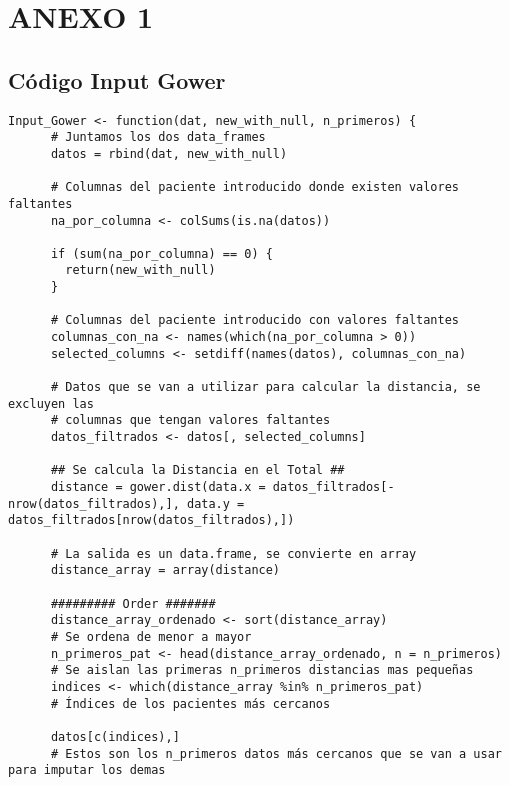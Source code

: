 \section{ANEXO 1}\label{sec:anexo1}


\subsection{Código Input Gower}\label{sec:codigo-input-gower}

\vspace{-5pt}

\begin{multicols}{2} %
  \begin{lstlisting}[style=mystyle]
    Input_Gower <- function(dat, new_with_null, n_primeros) {
      # Juntamos los dos data_frames
      datos = rbind(dat, new_with_null)
      
      # Columnas del paciente introducido donde existen valores faltantes
      na_por_columna <- colSums(is.na(datos))
      
      if (sum(na_por_columna) == 0) {
        return(new_with_null)
      }
      
      # Columnas del paciente introducido con valores faltantes
      columnas_con_na <- names(which(na_por_columna > 0))
      selected_columns <- setdiff(names(datos), columnas_con_na)
      
      # Datos que se van a utilizar para calcular la distancia, se excluyen las
      # columnas que tengan valores faltantes
      datos_filtrados <- datos[, selected_columns]
      
      ## Se calcula la Distancia en el Total ##
      distance = gower.dist(data.x = datos_filtrados[-nrow(datos_filtrados),], data.y =  datos_filtrados[nrow(datos_filtrados),])
      
      # La salida es un data.frame, se convierte en array
      distance_array = array(distance)
      
      ######### Order #######
      distance_array_ordenado <- sort(distance_array)
      # Se ordena de menor a mayor
      n_primeros_pat <- head(distance_array_ordenado, n = n_primeros)
      # Se aislan las primeras n_primeros distancias mas pequeñas
      indices <- which(distance_array %in% n_primeros_pat)
      # Índices de los pacientes más cercanos
      
      datos[c(indices),]
      # Estos son los n_primeros datos más cercanos que se van a usar para imputar los demas
      

\end{lstlisting}
\end{multicols}
